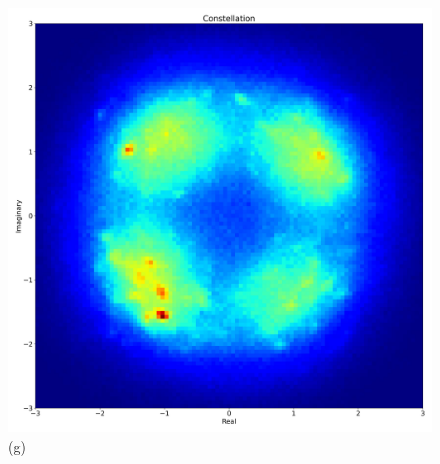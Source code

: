 \begin{landscape}
\begin{figure}[htpb]
\begin{minipage}[h]{0.45\linewidth}
\begin{minipage}[h]{0.49\linewidth}
{            \includegraphics[width=1\linewidth]{images/demo/twc/twc_6.jpg} (g) \\
        }
        \end{minipage}
        \hfill
        \begin{minipage}[h]{0.49\linewidth}
\end{minipage}
\end{minipage}
\end{figure}
\end{landscape}
